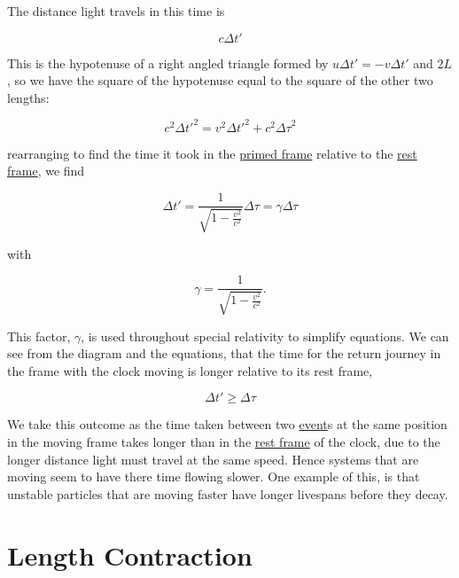 The distance light travels in this time is

\begin{equation}
	{c}{\Delta t{'}}
\end{equation}

This is the hypotenuse of a right angled triangle formed by ${u}{\Delta t{'}}=-{v}{\Delta t{'}}$ and $2{L}$, so we have the square of the hypotenuse equal to the square of the other two lengths:

\begin{equation}
	{c}^2 {\Delta t{'}}^2 = {v}^2 {\Delta t{'}}^2 + {c}^2{\Delta\tau}^2
\end{equation}

rearranging to find the time it took in the \hyperlink{def-Primed-Frame}{primed frame} relative to the \hyperlink{def-proper-frame}{rest frame}, we find

\begin{equation}
	{\Delta t{'}} = \frac{1}{\sqrt{1-\frac{{v}^2}{{c}^2}}} {\Delta\tau} = {\gamma} {\Delta\tau}
\end{equation}

with

\begin{equation}
	{\gamma} = \frac{1}{\sqrt{1-\frac{{v}^2}{{c}^2}}}.
\end{equation}

This factor, ${\gamma}$, is used throughout special relativity to simplify equations.
We can see from the diagram and the equations, that the time for the return journey in the frame with the clock moving is longer relative to its rest frame,

\begin{equation}
	{\Delta t{'}} \geq {\Delta\tau}
\end{equation}

We take this outcome as the time taken between two \hyperlink{def-event}{event}s at the same position in the moving frame takes longer than in the \hyperlink{def-proper-frame}{rest frame} of the clock, due to the longer distance light must travel at the same speed.
Hence systems that are moving seem to have there time flowing slower.
One example of this, is that unstable particles that are moving faster have longer livespans before they decay.

\section{Length Contraction} \label{sect: Length Contraction}


